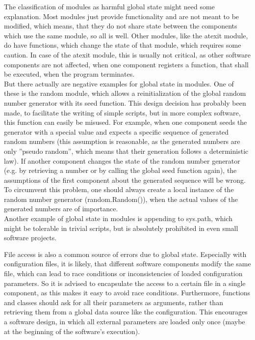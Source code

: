 		The classification of modules as harmful global state might need some explanation.
		Most modules just provide functionality and are not meant to be modified, which means, that they do not share state between the components which use the same module, so all is well.
		Other modules, like the {\normalfont \ttfamily atexit} module, do have functions, which change the state of that module, which requires some caution.
		In case of the {\normalfont \ttfamily atexit} module, this is usually not critical, as other software components are not affected, when one component registers a function, that shall be executed, when the program terminates.\\
		But there actually are negative examples for global state in modules.
		One of these is the {\normalfont \ttfamily random} module, which allows a reinitialization of the global random number generator with its {\normalfont \ttfamily seed} function.
		This design decision has probably been made, to facilitate the writing of simple scripts, but in more complex software, this function can easily be misused.
		For example, when one component seeds the generator with a special value and expects a specific sequence of generated random numbers (this assumption is reasonable, as the generated numbers are only ''pseudo random'', which means that their generation follows a deterministic law).
		If another component changes the state of the random number generator (e.g. by retrieving a number or by calling the global {\normalfont \ttfamily seed} function again), the assumptions of the first component about the generated sequence will be wrong.
		To circumvent this problem, one should always create a local instance of the random number generator ({\normalfont \ttfamily random.Random()}), when the actual values of the generated numbers are of importance.\\
		Another example of global state in modules is appending to {\normalfont \ttfamily sys.path}, which might be tolerable in trivial scripts, but is absolutely prohibited in even small software projects.

		File access is also a common source of errors due to global state.
		Especially with configuration files, it is likely, that different software components modify the same file, which can lead to race conditions or inconsistencies of loaded configuration parameters.
		So it is advised to encapsulate the access to a certain file in a single component, as this makes it easy to avoid race conditions.
		Furthermore, functions and classes should ask for all their parameters as arguments, rather than retrieving them from a global data source like the configuration.
		This encourages a software design, in which all external parameters are loaded only once (maybe at the beginning of the software's execution).

